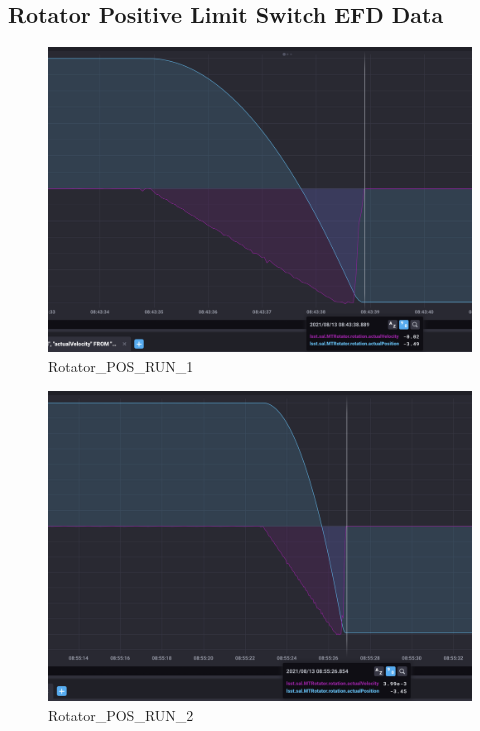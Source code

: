 \documentclass[SE,authoryear,toc, lsstdraft]{lsstdoc}
\begin{document}
\subsection{Rotator Positive Limit Switch EFD Data}
\begin{figure}
  \includegraphics[width=\linewidth]{media/rotator_pos_1.png}
  \caption{Rotator\_POS\_RUN\_1}
  \label{fig:Rotator_POS_RUN_1}
\end{figure}

\begin{figure}
  \includegraphics[width=\linewidth]{media/rotator_pos_2.png}
  \caption{Rotator\_POS\_RUN\_2}
  \label{fig:Rotator_POS_RUN_2}
\end{figure}
\end{document}
